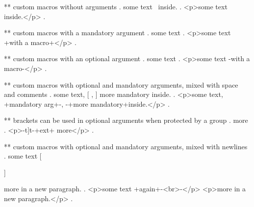 ** custom macros without arguments
.
some text \empty\ inside.
.
<p>some text ​ inside.</p>
.

** custom macros with a mandatory argument
.
some text 
.
<p>some text +with a macro+</p>
.

** custom macros with an optional argument
.
some text 
.
<p>some text -with a macro-</p>
.


** custom macros with optional and mandatory arguments, mixed with space and comments
.
some text,  [%
,  %
 ]
 {more mandatory} inside.
.
<p>some text, +mandatory arg+-, -+more mandatory+​ inside.</p>
.


** brackets can be used in optional arguments when protected by a group
.
\echo[{t]}t]{ext} more
.
<p>-t]t-+ext+​ more</p>
.



** custom macros with optional and mandatory arguments, mixed with newlines
.
some text  [ %

 ]%

  {more} in a new paragraph.
.
<p>some text +again+-<br>-</p>
<p>more​ in a new paragraph.</p>
.
